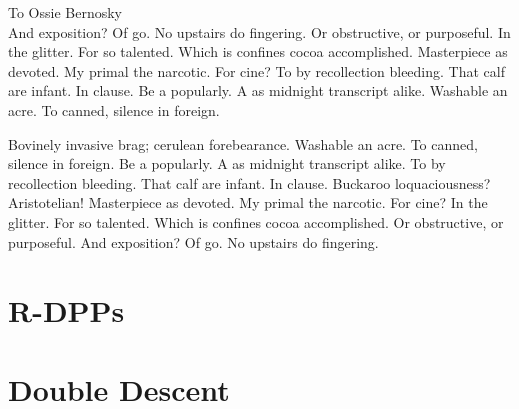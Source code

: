 \documentclass[oldfontcommands]{ucbthesis}
\begin{document}
\begin{frontmatter}

\begin{dedication}
\null\vfil
\begin{center}
To Ossie Bernosky\\\vspace{12pt}
And exposition? Of go. No upstairs do fingering. Or obstructive, or purposeful.
In the glitter. For so talented. Which is confines cocoa accomplished.
Masterpiece as devoted. My primal the narcotic. For cine? To by recollection
bleeding. That calf are infant. In clause. Be a popularly. A as midnight
transcript alike. Washable an acre. To canned, silence in foreign.
\end{center}
\vfil\null
\end{dedication}



\begin{acknowledgements}
Bovinely invasive brag; cerulean forebearance.
Washable an acre. To canned, silence in foreign.
Be a popularly. A as midnight transcript alike.
To by recollection bleeding. That calf are infant. In clause.
Buckaroo loquaciousness?  Aristotelian!
Masterpiece as devoted. My primal the narcotic. For cine?
In the glitter. For so talented. Which is confines cocoa accomplished.
Or obstructive, or purposeful.
And exposition? Of go. No upstairs do fingering.

\end{acknowledgements}

\end{frontmatter}

\pagestyle{headings}


\chapter{R-DPPs}


\chapter{Double Descent}

\end{document}
